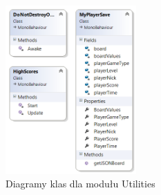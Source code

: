 \documentclass[a4paper, 11pt]{article}
\begin{document}
\begin{figure}[H]
	\centering
	\includegraphics[width=5cm]{zrzuty/class_util.png}
	\caption{Diagramy klas dla modułu Utilities}
	\label{fig:class_util}
\end{figure}
\newpage
\end{document}
